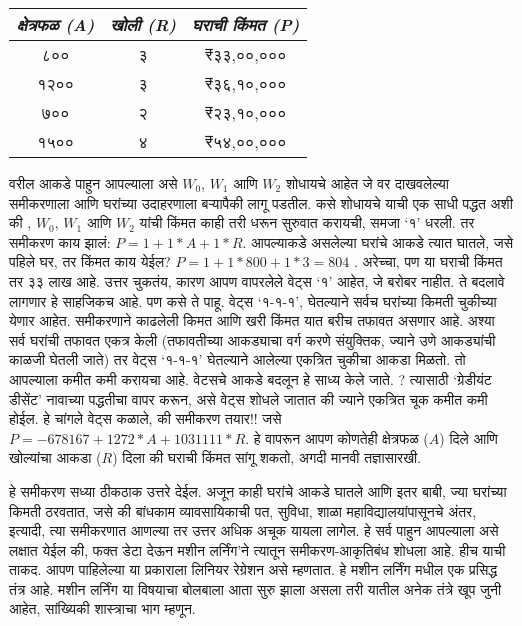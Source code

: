 \begin{table}[h!]
\centering
\begin{tabular}{|c|c|c|}
\hline
\textit{क्षेत्रफळ (A)} & \textit{खोली (R)} & \textit{घराची किंमत (P)} \\
\hline
८०० & ३ & ₹३३,००,००० \\
१२०० & ३ & ₹३६,१०,००० \\
७०० & २ & ₹२३,१०,००० \\
१५०० & ४ & ₹५४,००,००० \\
\hline
\end{tabular}
\end{table}


वरील आकडे पाहुन आपल्याला असे $W_0$, $W_1$ आणि $W_2$ शोधायचे आहेत जे वर दाखवलेल्या समीकरणाला आणि घरांच्या उदाहरणाला बऱ्यापैकी लागू पडतील. कसे शोधायचे याची एक साधी पद्धत अशी की , $W_0$, $W_1$ आणि $W_2$ यांची किंमत काही तरी धरून सुरुवात करायची, समजा `१' धरली. तर समीकरण काय झालं: $P = 1+ 1 *A + 1 *R$. आपल्याकडे असलेल्या घरांचे आकडे त्यात घातले, जसे पहिले घर, तर किंमत काय येईल? $P = 1+ 1 * 800 + 1*3 = 804$ . अरेच्चा, पण या घराची किंमत तर ३३ लाख आहे. उत्तर चुकतंय, कारण आपण वापरलेले वेट्स `१' आहेत, जे बरोबर नाहीत. ते बदलावे लागणार हे साहजिकच आहे. पण कसे ते पाहू. वेट्स `१-१-१', घेतल्याने सर्वच घरांच्या किमती चुकीच्या येणार आहेत. समीकरणाने काढलेली किमत आणि खरी किंमत यात बरीच तफावत असणार आहे. अश्या सर्व घरांची तफावत एकत्र केली (तफावतीच्या आकड्याचा वर्ग करणे संयुक्तिक, ज्याने उणे आकड्यांची काळजी घेतली जाते) तर वेट्स `१-१-१' घेतल्याने आलेल्या एकत्रित चुकीचा आकडा मिळतो. तो आपल्याला कमीत कमी करायचा आहे. वेटसचे आकडे बदलून हे साध्य केले जाते. ? त्यासाठी `ग्रेडीयंट डीसेंट' नावाच्या पद्धतीचा वापर करून, असे वेट्स शोधले जातात की ज्याने एकत्रित चूक कमीत कमी होईल. हे चांगले वेट्स कळाले, की समीकरण तयार!! जसे $P = -678167 + 1272 * A + 1031111 * R$. हे वापरून आपण कोणतेही क्षेत्रफळ ($A$) दिले आणि खोल्यांचा आकडा ($R$) दिला की  घराची किंमत सांगू शकतो, अगदी मानवी तज्ञासारखी.

हे समीकरण सध्या ठीकठाक उत्तरे देईल. अजून काही घरांचे आकडे  घातले  आणि इतर बाबी, ज्या घरांच्या किमती ठरवतात, जसे की बांधकाम व्यावसायिकाची पत, सुविधा, शाळा महाविद्यालयांपासूनचे अंतर, इत्यादी, त्या समीकरणात आणल्या तर उत्तर अधिक अचूक यायला लागेल. हे सर्व पाहुन आपल्याला असे लक्षात येईल की, फक्त डेटा देऊन मशीन लर्निंग'ने त्यातून समीकरण-आकृतिबंध शोधला आहे. हीच याची ताकद. आपण पाहिलेल्या या प्रकाराला लिनियर रेग्रेशन असे म्हणतात. हे मशीन लर्निंग मधील एक प्रसिद्ध तंत्र आहे. मशीन लर्निंग या विषयाचा बोलबाला आता सुरु झाला असला तरी यातील अनेक तंत्रे खूप जुनी आहेत, सांख्यिकी शास्त्राचा भाग म्हणून.

